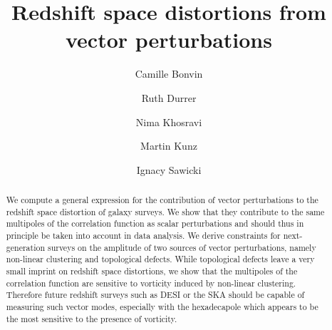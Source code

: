 \documentclass[a4paper,twocolumn,aps,prd,nolongbibliography,superscriptaddress,showpacs,showkeys,amsmath,amssymb,floatfix,nofootinbib]{revtex4-1}
\renewcommand{\[}{\begin{equation}}
\renewcommand{\]}{\end{equation}}
\begin{document}
\title{Redshift space distortions from vector perturbations}


\author{Camille Bonvin}



\author{Ruth Durrer}



\author{Nima Khosravi}



\author{Martin Kunz}




\author{Ignacy Sawicki}





\begin{abstract}
We compute a general expression for the contribution of vector perturbations to the redshift space distortion of galaxy surveys. We show that they contribute to the same multipoles of the correlation function as scalar perturbations and should thus in principle be taken into account in data analysis. We derive constraints for next-generation surveys on the amplitude of two sources of vector perturbations, namely non-linear clustering and topological defects. While topological defects leave a very small imprint on redshift space distortions,  we show that the multipoles of the correlation function are sensitive to vorticity induced by non-linear clustering. Therefore future redshift surveys such as DESI or the SKA should be capable of measuring such vector modes, especially with the hexadecapole which appears to be the most sensitive to the presence of vorticity.
\end{abstract}
\maketitle
\end{document}
